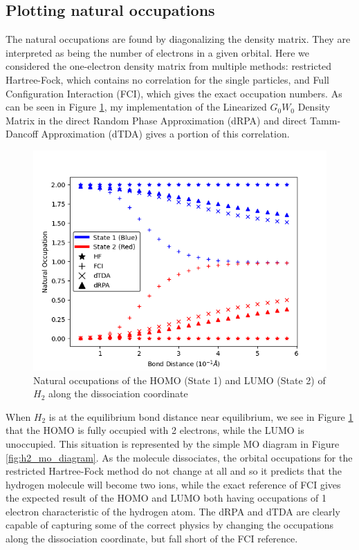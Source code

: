 \documentclass[12pt]{caltech_thesis}
\begin{document}
\subsection{Plotting natural occupations}
The natural occupations are found by diagonalizing the density matrix. They are interpreted as being the number of electrons in a given orbital.\autocite{szabo_modern_2012} Here we considered the one-electron density matrix from multiple methods: restricted Hartree-Fock, which contains no correlation for the single particles, and Full Configuration Interaction (FCI), which gives the exact occupation numbers. As can be seen in Figure \ref{fig:h2_dissociation}, my implementation of the Linearized $G_0W_0$ Density Matrix in the direct Random Phase Approximation (dRPA) and direct Tamm-Dancoff Approximation (dTDA) gives a portion of this correlation.
\begin{figure}[h]
    \centering
    \includegraphics[width=\textwidth]{h2_occupations.png}
\caption{Natural occupations of the HOMO (State 1) and LUMO (State 2) of $H_2$ along the dissociation coordinate}
\label{fig:h2_dissociation}
\end{figure}
When \(H_2\) is at the equilibrium bond distance near equilibrium, we see in Figure \ref{fig:h2_dissociation} that the HOMO is fully occupied with 2 electrons, while the LUMO is unoccupied. This situation is represented by the simple MO diagram in Figure \ref{fig:h2_mo_diagram}. As the molecule dissociates, the orbital occupations for the restricted Hartree-Fock method do not change at all and so it predicts that the hydrogen molecule will become two ions, while the exact reference of FCI gives the expected result of the HOMO and LUMO both having occupations of 1 electron characteristic of the hydrogen atom. The dRPA and dTDA are clearly capable of capturing some of the correct physics by changing the occupations along the dissociation coordinate, but fall short of the FCI reference.
\end{document}
